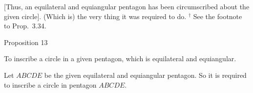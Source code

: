 \mbox{[}Thus, an equilateral and equiangular pentagon has been circumscribed
about the given circle]. (Which is) the very thing it was required to do. 
{\footnotesize \noindent$^\dag$ See the footnote to Prop.~3.34.} 


\begin{center}
{\large Proposition 13}
\end{center}

To inscribe a circle in a given
pentagon, which is equilateral and equiangular.

\epsfysize=2.2in
\centerline{}

Let $ABCDE$ be the given equilateral and equiangular pentagon. So
it is required to inscribe a circle in pentagon $ABCDE$.

